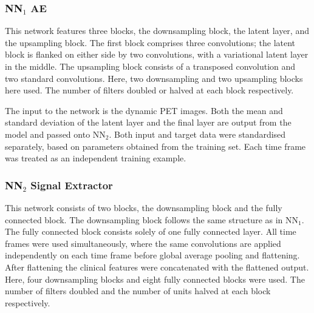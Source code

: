         \subsubsection{\gls{NN}$_1$ \gls{AE}} \label{sec:NN1}
            This network features three blocks, the downsampling block, the latent layer, and the upsampling block. The first block comprises three convolutions; the latent block is flanked on either side by two convolutions, with a variational latent layer in the middle. The upsampling block consists of a transposed convolution and two standard convolutions. Here, two downsampling and two upsampling blocks here used. The number of filters doubled or halved at each block respectively.
            
            The input to the network is the dynamic \gls{PET} images. Both the mean and standard deviation of the latent layer and the final layer are output from the model and passed onto \gls{NN}$_2$. Both input and target data were standardised separately, based on parameters obtained from the training set. Each time frame was treated as an independent training example.


        \subsubsection{\gls{NN}$_2$ Signal Extractor} \label{sec:NN2}
            This network consists of two blocks, the downsampling block and the fully connected block. The downsampling block follows the same structure as in \gls{NN}$_1$. The fully connected block consists solely of one fully connected layer. All time frames were used simultaneously, where the same convolutions are applied independently on each time frame before global average pooling and flattening. After flattening the clinical features were concatenated with the flattened output. Here, four downsampling blocks and eight fully connected blocks were used. The number of filters doubled and the number of units halved at each block respectively.

            
